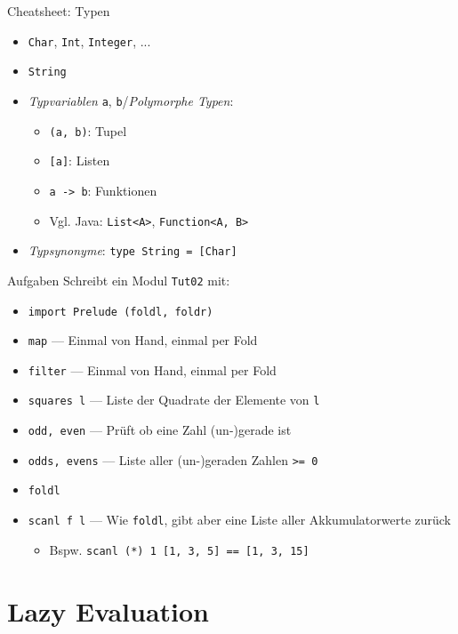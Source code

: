 \documentclass{beamer}
\begin{document}
\begin{frame}{Cheatsheet: Typen}
  \begin{itemize}
    \item \texttt{Char}, \texttt{Int}, \texttt{Integer}, ...
    \item \texttt{String}
    \item \emph{Typvariablen} \texttt{a}, \texttt{b}/\emph{Polymorphe Typen}:
    \begin{itemize}
      \item \texttt{(a, b)}: Tupel
      \item \texttt{[a]}: Listen
      \item \texttt{a -> b}: Funktionen
      \item Vgl. Java: \texttt{List<A>}, \texttt{Function<A, B>}
    \end{itemize}
    \item \emph{Typsynonyme}: \texttt{type String = [Char]}
  \end{itemize}
\end{frame}

\begin{frame}{Aufgaben}
	Schreibt ein Modul \texttt{Tut02} mit:

	\begin{itemize}
          \item \texttt{import Prelude (foldl, foldr)}
		\item \texttt{map} --- Einmal von Hand, einmal per Fold
		\item \texttt{filter} --- Einmal von Hand, einmal per Fold
		\item \texttt{squares l} --- Liste der Quadrate der Elemente von \texttt{l}
		\item \texttt{odd, even} --- Prüft ob eine Zahl (un-)gerade ist
		\item \texttt{odds, evens} --- Liste aller (un-)geraden Zahlen \texttt{>= 0}
   		\pause
		\item \texttt{foldl}
		\item \texttt{scanl f l} --- Wie \texttt{foldl}, gibt aber eine Liste aller Akkumulatorwerte zurück
		\begin{itemize}
			\item Bspw. \texttt{scanl (*) 1 [1, 3, 5] == [1, 3, 15]}
		\end{itemize}
	\end{itemize}
\end{frame}

\section{Lazy Evaluation}
\end{document}
